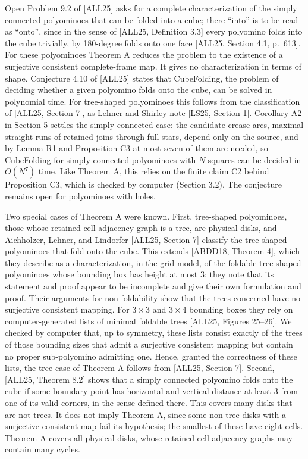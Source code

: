 \documentclass[
  11pt,
]{article}
\begin{document}
Open Problem 9.2 of {[}ALL25{]} asks for a complete characterization of
the simply connected polyominoes that can be folded into a cube; there
``into'' is to be read as ``onto'', since in the sense of {[}ALL25,
Definition 3.3{]} every polyomino folds into the cube trivially, by
180-degree folds onto one face {[}ALL25, Section 4.1, p.~613{]}. For
these polyominoes Theorem A reduces the problem to the existence of a
surjective consistent complete-frame map. It gives no characterization
in terms of shape. Conjecture 4.10 of {[}ALL25{]} states that
CubeFolding, the problem of deciding whether a given polyomino folds
onto the cube, can be solved in polynomial time. For tree-shaped
polyominoes this follows from the classification of {[}ALL25, Section
7{]}, as Lehner and Shirley note {[}LS25, Section 1{]}. Corollary A2 in
Section 5 settles the simply connected case: the candidate crease arcs,
maximal straight runs of retained joins through full stars, depend only
on the source, and by Lemma R1 and Proposition C3 at most seven of them
are needed, so CubeFolding for simply connected polyominoes with \(N\)
squares can be decided in \(O(N^7)\) time. Like Theorem A, this relies
on the finite claim C2 behind Proposition C3, which is checked by
computer (Section 3.2). The conjecture remains open for polyominoes with
holes.

Two special cases of Theorem A were known. First, tree-shaped
polyominoes, those whose retained cell-adjacency graph is a tree, are
physical disks, and Aichholzer, Lehner, and Lindorfer {[}ALL25, Section
7{]} classify the tree-shaped polyominoes that fold onto the cube. This
extends {[}ABDD18, Theorem 4{]}, which they describe as a
characterization, in the grid model, of the foldable tree-shaped
polyominoes whose bounding box has height at most 3; they note that its
statement and proof appear to be incomplete and give their own
formulation and proof. Their arguments for non-foldability show that the
trees concerned have no surjective consistent mapping. For \(3\times3\)
and \(3\times4\) bounding boxes they rely on computer-generated lists of
minimal foldable trees {[}ALL25, Figures 25--26{]}. We checked by
computer that, up to symmetry, these lists consist exactly of the trees
of those bounding sizes that admit a surjective consistent mapping but
contain no proper sub-polyomino admitting one. Hence, granted the
correctness of these lists, the tree case of Theorem A follows from
{[}ALL25, Section 7{]}. Second, {[}ALL25, Theorem 8.2{]} shows that a
simply connected polyomino folds onto the cube if some boundary point
has horizontal and vertical distance at least 3 from one of its valid
corners, in the sense defined there. This covers many disks that are not
trees. It does not imply Theorem A, since some non-tree disks with a
surjective consistent map fail its hypothesis; the smallest of these
have eight cells. Theorem A covers all physical disks, whose retained
cell-adjacency graphs may contain many cycles.
\end{document}
